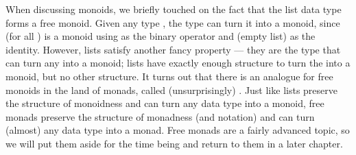 When discussing monoids, we briefly touched on the fact that the list data type \inline{[]} forms a
free monoid. Given any type , the \inline{[]} type can turn it into a monoid, since
\inline{[a]} (for all ) is a monoid using \inline{++} as the binary operator and
\inline{[]} (empty list) as the identity. However, lists satisfy another fancy property --- they are
the  type that can turn any  into a monoid; lists have exactly enough
structure to turn the  into a monoid, but no other structure. It turns out that there is
an analogue for free monoids in the land of monads, called (unsurprisingly) .
Just like lists preserve the structure of monoidness and can turn any data type into a monoid, free
monads preserve the structure of monadness (and  notation) and can turn (almost) any data
type into a monad. Free monads are a fairly advanced topic, so we will put them aside for the time
being and return to them in a later chapter.
